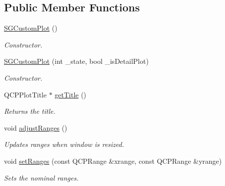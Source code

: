 \subsection*{Public Member Functions}
\begin{DoxyCompactItemize}
\item 
\mbox{\label{classSGCustomPlot_a5a4641a2110a34cb967b5de276f5f457}} 
\hyperlink{classSGCustomPlot_a5a4641a2110a34cb967b5de276f5f457}{S\+G\+Custom\+Plot} ()
\begin{DoxyCompactList}\small\item\em Constructor. \end{DoxyCompactList}\item 
\hyperlink{classSGCustomPlot_a95ebb2e31d5aa9bcbd850bb99c5e6d95}{S\+G\+Custom\+Plot} (int \+\_\+state, bool \+\_\+is\+Detail\+Plot)
\begin{DoxyCompactList}\small\item\em Constructor. \end{DoxyCompactList}\item 
\mbox{\label{classSGCustomPlot_a9ef7a8ce9d52fab259120958b3596622}} 
Q\+C\+P\+Plot\+Title $\ast$ \hyperlink{classSGCustomPlot_a9ef7a8ce9d52fab259120958b3596622}{get\+Title} ()
\begin{DoxyCompactList}\small\item\em Returns the title. \end{DoxyCompactList}\item 
\mbox{\label{classSGCustomPlot_a318a8971c236a0f675bdc28bebdecc12}} 
void \hyperlink{classSGCustomPlot_a318a8971c236a0f675bdc28bebdecc12}{adjust\+Ranges} ()
\begin{DoxyCompactList}\small\item\em Updates ranges when window is resized. \end{DoxyCompactList}\item 
void \hyperlink{classSGCustomPlot_ad20fcf8ce5db4628acdddae73238301c}{set\+Ranges} (const Q\+C\+P\+Range \&xrange, const Q\+C\+P\+Range \&yrange)
\begin{DoxyCompactList}\small\item\em Sets the nominal ranges. \end{DoxyCompactList}\item 
\mbox{\label{classSGCustomPlot_abc4224d3185bed305f40646626e30625}} 

\end{DoxyCompactItemize}
